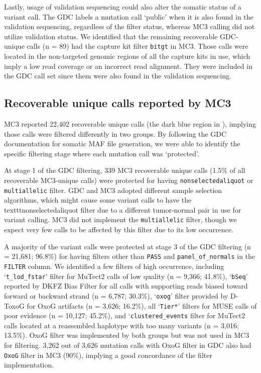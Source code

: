 Lastly, usage of validation sequencing could also alter the somatic status of a variant call. The GDC labels a mutation call `public' when it is also found in the validation sequencing, regardless of the filter status, whereas MC3 calling did not utilize validation status. We identified that the remaining recoverable GDC-unique calls (n = 89) had the capture kit filter \texttt{bitgt} in MC3. Those calls were located in the non-targeted genomic regions of all the capture kits in use, which imply a low read coverage or an incorrect read alignment. They were included in the GDC call set since them were also found in the validation sequencing.


\subsection{Recoverable unique calls reported by MC3}
MC3 reported 22,402 recoverable unique calls (the dark blue region in ), implying those calls were filtered differently in two groups. By following the GDC documentation for somatic MAF file generation, we were able to identify the specific filtering stage where each mutation call was `protected'.

At stage 1 of the GDC filtering, 339 MC3 recoverable unique calls (1.5\% of all recoverable MC3-unique calls) were protected for having \texttt{nonselectedaliquot} or \texttt{multiallelic} filter. GDC and MC3 adopted different sample selection algorithms, which might cause some variant calls to have the texttt{nonselectedaliquot} filter due to a different tumor-normal pair in use for variant calling. MC3 did not implement the \texttt{multiallelic} filter, though we expect very few calls to be affected by this filter due to its low occurrence.

A majority of the variant calls were protected at stage 3 of the GDC filtering (n = 21,681; 96.8\%) for having filters other than \texttt{PASS} and \texttt{panel\_of\_normals} in the \texttt{FILTER} column. We identified a few filters of high occurrence, including `\texttt{t\_lod\_fstar}' filter for MuTect2 calls of low quality (n = 9,366; 41.8\%), `\texttt{bSeq}' reported by DKFZ Bias Filter for all calls with supporting reads biased toward forward or backward strand (n = 6,787; 30.3\%), `\texttt{oxog}' filter provided by D-ToxoG \cite{costellom_getzg:DiscoveryCharacterization2013a} for OxoG artifacts (n = 3,626; 16.2\%), all `\texttt{Tier*}' filters for MUSE calls of poor evidence (n = 10,127; 45.2\%), and `\texttt{clustered\_events} filter for MuTect2 calls located at a reassembled haplotype with too many variants (n = 3,016; 13.5\%). OxoG filter was implemented by both groups but was not used in MC3 for filtering. 3,262 out of 3,626 mutation calls with OxoG filter in GDC also had \texttt{OxoG} filter in MC3 (90\%), implying a good concordance of the filter implementation.

